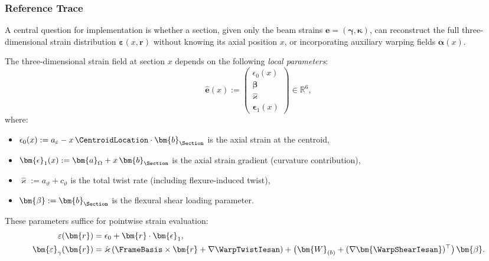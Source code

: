 
\subsubsection{Reference Trace}

A central question for implementation is whether a section, given only the 
beam strains $\bm{e} = (\bm{\gamma}, \bm{\kappa})$, can reconstruct the full 
three-dimensional strain distribution $\bm{\varepsilon}(x, \bm{r})$ without 
knowing its axial position $x$, or incorporating auxiliary warping fields \(\bm{\alpha}(x)\).

The three-dimensional strain field at section $x$ depends on the following 
\emph{local parameters}:
\begin{equation}
\hat{\bm{e}}(x) := \begin{pmatrix} 
\epsilon_0(x) \\ \bm{\beta} \\ \hat{\varkappa} \\ \bm{\epsilon}_1(x) 
\end{pmatrix} \in \mathbb{R}^6,
\label{eq:local-params}
\end{equation}
where:
\begin{itemize}
\item $\epsilon_0(x) := a_\varepsilon - x\,\CentroidLocation \cdot \bm{b}_{\Section}$ 
is the axial strain at the centroid,
\item $\bm{\epsilon}_1(x) := \bm{a}_\Omega + x\,\bm{b}_{\Section}$ is the axial 
strain gradient (curvature contribution),
\item $\hat{\varkappa} := a_\vartheta + c_\vartheta$ is the total twist rate 
(including flexure-induced twist),
\item $\bm{\beta} := \bm{b}_{\Section}$ is the flexural shear loading parameter.
\end{itemize}

These parameters suffice for pointwise strain evaluation:
\begin{align}
\varepsilon(\bm{r}) &= \epsilon_0 + \bm{r} \cdot \bm{\epsilon}_1, 
\label{eq:axial-strain-local} \\
\bm{\varepsilon}_\gamma(\bm{r}) &= \hat{\varkappa}\,(\FrameBasis \times \bm{r} + \nabla\WarpTwistIesan) 
+ \big(\bm{W}_{(b)} + (\nabla\bm{\WarpShearIesan})^\top\big)\,\bm{\beta}.
\label{eq:shear-strain-local}
\end{align}

